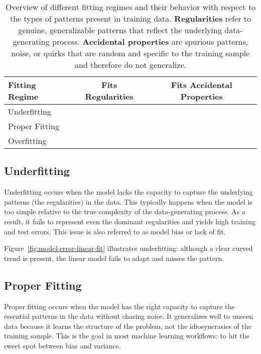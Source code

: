 \documentclass[12pt,openany, draft]{book}
\newcommand{\cmark}{{\color{green!60!black}\ding{51}}} %
\newcommand{\xmark}{{\color{red!80!black}\ding{55}}}   %
\begin{document}
\begin{table}[H]
    \centering
    \small
    \caption{
        Overview of different fitting regimes and their behavior with respect to the types of patterns present in training data. 
        \textbf{Regularities} refer to genuine, generalizable patterns that reflect the underlying data-generating process.
        \textbf{Accidental properties} are spurious patterns, noise, or quirks that are random and specific to the training sample and therefore do not generalize.
        }
    \renewcommand{\arraystretch}{1.4}
    \begin{tabular}{|l|c|c|}
        \hline
        \textbf{Fitting Regime} & \textbf{Fits Regularities} & \textbf{Fits Accidental Properties} \\
        \hline
        Underfitting   & \xmark & \xmark \\
        Proper Fitting & \cmark & \xmark \\
        Overfitting    & \cmark & \cmark \\
        \hline
    \end{tabular}
\end{table}


\subsection{Underfitting}  \label{subsec:underfitting}

Underfitting occurs when the model lacks the capacity to capture the underlying patterns (the regularities) in the data. This typically happens when the model is too simple relative to the true complexity of the data-generating process. As a result, it fails to represent even the dominant regularities and yields high training and test errors. This issue is also referred to as model bias or lack of fit. \newline

Figure~\ref{fig:model-error-linear-fit} illustrates underfitting: although a clear curved trend is present, the linear model fails to adapt and misses the pattern.


\subsection{Proper Fitting}  \label{subsec:proper_fitting}

Proper fitting occurs when the model has the right capacity to capture the essential patterns in the data without chasing noise. It generalizes well to unseen data because it learns the structure of the problem, not the idiosyncrasies of the training sample. This is the goal in most machine learning workflows: to hit the sweet spot between bias and variance. \newline
\end{document}
